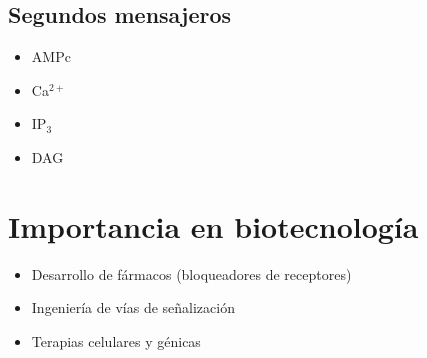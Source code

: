 \subsection{Segundos mensajeros}
\begin{itemize}
    \item AMPc
    \item Ca$^{2+}$
    \item IP$_3$
    \item DAG
\end{itemize}

\section{Importancia en biotecnología}
\begin{itemize}
    \item Desarrollo de fármacos (bloqueadores de receptores)
    \item Ingeniería de vías de señalización
    \item Terapias celulares y génicas
\end{itemize}